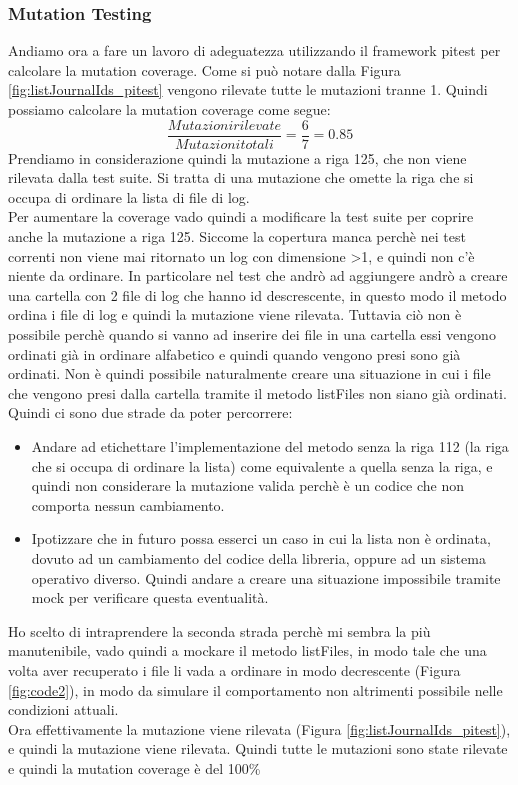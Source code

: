 \documentclass[10pt, a4paper]{article}
\begin{document}
\subsubsection{Mutation Testing}
Andiamo ora a fare un lavoro di adeguatezza utilizzando il framework pitest per calcolare la mutation coverage. 
Come si può notare dalla Figura \ref{fig:listJournalIds_pitest} vengono rilevate tutte le mutazioni tranne 1.
Quindi possiamo calcolare la mutation coverage come segue:
\[\frac{{Mutazioni rilevate}}{{Mutazioni totali}} = \frac{{6}}{{7}} = 0.85\]
Prendiamo in considerazione quindi la mutazione a riga 125, che non viene rilevata dalla test suite. Si tratta 
di una mutazione che omette la riga che si occupa di ordinare la lista di file di log. \\

Per aumentare la coverage vado quindi a modificare la test suite per coprire anche la mutazione a riga 125.
Siccome la copertura manca perchè nei test correnti non viene mai ritornato un log con dimensione \textgreater1, e 
quindi non c'è niente da ordinare. In particolare nel test che andrò ad aggiungere andrò a creare una cartella con 2 file
di log che hanno id descrescente, in questo modo il metodo ordina i file di log e quindi la mutazione viene rilevata.
Tuttavia ciò non è possibile perchè quando si vanno ad inserire dei file in una cartella essi vengono ordinati già in ordinare
alfabetico e quindi quando vengono presi sono già ordinati. Non è quindi possibile naturalmente creare una situazione 
in cui i file che vengono presi dalla cartella tramite il metodo listFiles\(\) non siano già ordinati. \\
Quindi ci sono due strade da poter percorrere:
\begin{itemize}
  \item Andare ad etichettare l'implementazione del metodo senza la riga 112 (la riga che si occupa di ordinare la lista) 
  come equivalente a quella senza la riga, e quindi non considerare la mutazione valida perchè è un codice che non
  comporta nessun cambiamento.
  \item Ipotizzare che in futuro possa esserci un caso in cui la lista non è ordinata, dovuto ad un cambiamento del codice
  della libreria, oppure ad un sistema operativo diverso. Quindi andare a creare una situazione impossibile tramite mock per
  verificare questa eventualità.
\end{itemize} 
Ho scelto di intraprendere la seconda strada perchè mi sembra la più manutenibile, vado quindi a mockare 
il metodo listFiles\(\), in modo tale che una volta aver recuperato i file li vada a 
ordinare in modo decrescente (Figura \ref{fig:code2}), in modo da simulare il comportamento non altrimenti possibile nelle condizioni attuali. \\
Ora effettivamente la mutazione viene rilevata (Figura \ref{fig:listJournalIds_pitest}), e quindi la mutazione viene rilevata.
Quindi tutte le mutazioni sono state rilevate e quindi la mutation coverage è del 100\% 
\end{document}
